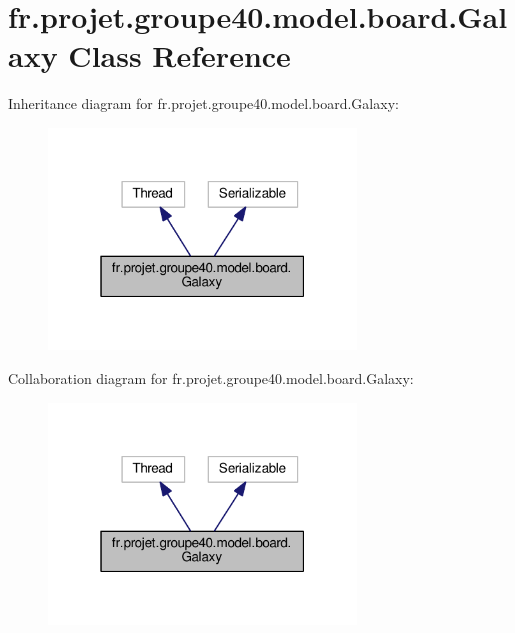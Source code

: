 \hypertarget{classfr_1_1projet_1_1groupe40_1_1model_1_1board_1_1_galaxy}{}\section{fr.\+projet.\+groupe40.\+model.\+board.\+Galaxy Class Reference}
\label{classfr_1_1projet_1_1groupe40_1_1model_1_1board_1_1_galaxy}


Inheritance diagram for fr.\+projet.\+groupe40.\+model.\+board.\+Galaxy\+:\nopagebreak
\begin{figure}[H]
\begin{center}
\leavevmode
\includegraphics[width=232pt]{classfr_1_1projet_1_1groupe40_1_1model_1_1board_1_1_galaxy__inherit__graph}
\end{center}
\end{figure}


Collaboration diagram for fr.\+projet.\+groupe40.\+model.\+board.\+Galaxy\+:\nopagebreak
\begin{figure}[H]
\begin{center}
\leavevmode
\includegraphics[width=232pt]{classfr_1_1projet_1_1groupe40_1_1model_1_1board_1_1_galaxy__coll__graph}
\end{center}
\end{figure}
